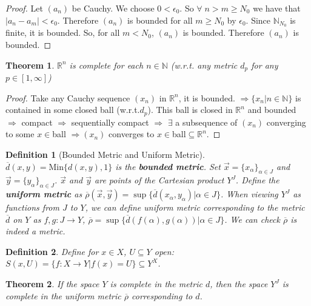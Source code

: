 \documentclass[article,11pt, reqno]{article}
\newtheorem*{theorem}{Theorem}
\newtheorem*{definition}{Definition}
\theoremstyle{remark}
\newcommand{\R}{\mathbb{R}}
\newcommand{\N}{\mathbb{N}}
\newcommand{\Ra}{\Rightarrow}
\newcommand{\mc}{\mathcal}
\newcommand{\ra}{\rightarrow}
\newcommand{\MIN}{\text{Min}}
\newcommand{\<}{\langle}
\renewcommand{\>}{\rangle}
\begin{document}
\begin{proof}
    Let $(a_{n})$ be Cauchy. We choose $ 0<\epsilon_{0}$. So $ \forall \; n>m\geq N_{0}$ we have that $\vert a_{n}-a_{m} \vert < \epsilon_{0}$. Therefore $(a_{n})$ is bounded for all $ m \geq N_{0} $ by $ \epsilon_{0} $. Since $ \mathbb{N}_{N_{0}}$ is finite, it is bounded. So, for all $ m<N_{0} $, $ (a_{n})$ is bounded. Therefore $(a_{n})$ is bounded.
\end{proof}
\begin{theorem}
    $\R^n$ is complete for each $n\in \N$ (w.r.t. any metric $d_p$ for any $p\in[1,\infty]$)
\end{theorem}
\begin{proof}
    Take any Cauchy sequence $(x_n)$ in $\R^n$, it is bounded. $\Ra\{x_n|n\in \N\}$ is contained in some closed ball (w.r.t.$d_p$). This ball is closed in $\R^n$ and bounded $\Ra$ compact $\Ra$ sequentially compact $\Ra$ $\exists$ a subsequence of $(x_n)$ converging to some $x\in$ball $\Ra(x_n)$ converges to $x\in$ball$\subseteq\R^n$.
\end{proof}
\begin{definition}[Bounded Metric and Uniform Metric]
    $\overline d(x,y)=\MIN\{d(x,y),1\}$ is the \textbf{bounded metric}. Set $\vec{x}=\{x_{\alpha}\}_{\alpha\in J}$ and $\vec{y}=\{y_{\alpha}\}_{\alpha\in J}$. $\vec{x}$ and $\vec{y}$ are points of the Cartesian product $Y^J$. Define the \textbf{uniform metric} as $\overline{\rho}(\vec{x},\vec{y})=\sup\{\overline{d}(x_{\alpha},y_{\alpha})|\alpha\in J\}$. When viewing $Y^J$ as functions from $J$ to $Y$, we can define uniform metric corresponding to the metric $\overline{d}$ on $Y$ as $f,g: J\ra Y$, $\overline{\rho}=\sup\{\overline{d}(f(\alpha),g(\alpha))| \alpha\in J\}$. We can check $\overline{\rho}$ is indeed a metric.
\end{definition}
\begin{definition}
    Define for $x\in X$, $U\subseteq Y$ open: $S(x,U)=\{f: X\ra Y|f(x)=U\}\subseteq Y^X$.
\end{definition}
\begin{comment}
$S(x_1,U_1)\cap S(x_2,U_2)$, $\mc S=\{S(x,U)|x\in X, U\subseteq Y\}$ is a subbasis. If $X$ is finite, this will be a basis.
\end{comment}
\begin{theorem}
    If the space $Y$ is complete in the metric $d$, then the space $Y^J$ is complete in the uniform metric $\overline{\rho}$ corresponding to $d$.
\end{theorem}
\end{document}
